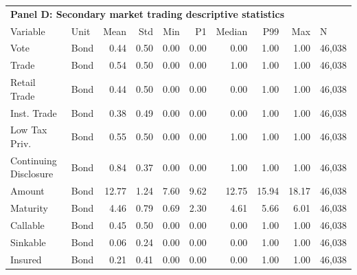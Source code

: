 \begin{table}[H]
\centering
\begin{tabular*}{\textwidth}{@{\extracolsep{\fill}}llrrrrrrrl}
\multicolumn{10}{l}{\textbf{Panel D: Secondary market trading descriptive statistics}}\\

\addlinespace
  \toprule
Variable & Unit & Mean & Std & Min & P1 & Median & P99 & Max & N \\ 
  \hline
Vote & Bond & 0.44 & 0.50 & 0.00 & 0.00 & 0.00 & 1.00 & 1.00 & 46,038 \\ 
  Trade & Bond & 0.54 & 0.50 & 0.00 & 0.00 & 1.00 & 1.00 & 1.00 & 46,038 \\ 
  Retail Trade & Bond & 0.44 & 0.50 & 0.00 & 0.00 & 0.00 & 1.00 & 1.00 & 46,038 \\ 
  Inst. Trade & Bond & 0.38 & 0.49 & 0.00 & 0.00 & 0.00 & 1.00 & 1.00 & 46,038 \\ 
  Low Tax Priv. & Bond & 0.55 & 0.50 & 0.00 & 0.00 & 1.00 & 1.00 & 1.00 & 46,038 \\ 
  Continuing Disclosure & Bond & 0.84 & 0.37 & 0.00 & 0.00 & 1.00 & 1.00 & 1.00 & 46,038 \\ 
  Amount & Bond & 12.77 & 1.24 & 7.60 & 9.62 & 12.75 & 15.94 & 18.17 & 46,038 \\ 
  Maturity & Bond & 4.46 & 0.79 & 0.69 & 2.30 & 4.61 & 5.66 & 6.01 & 46,038 \\ 
  Callable & Bond & 0.45 & 0.50 & 0.00 & 0.00 & 0.00 & 1.00 & 1.00 & 46,038 \\ 
  Sinkable & Bond & 0.06 & 0.24 & 0.00 & 0.00 & 0.00 & 1.00 & 1.00 & 46,038 \\ 
  Insured & Bond & 0.21 & 0.41 & 0.00 & 0.00 & 0.00 & 1.00 & 1.00 & 46,038 \\ 
   \hline
\end{tabular*}
\end{table}
